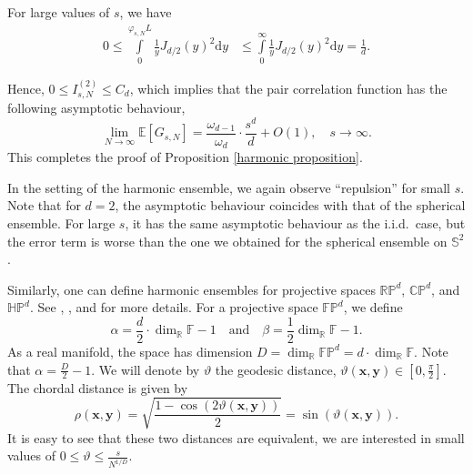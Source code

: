 \documentclass[a4paper,11pt]{amsart}
\begin{document}
For large values of $s$, we have 
\begin{align*}
    0\leq\int\limits_0^{\varphi_{s,N}L}\frac{1}{y}J_{d/2}(y)^2\mathrm{d}y&\leq \int\limits_0^{\infty}\frac{1}{y}J_{d/2}(y)^2\mathrm{d}y=\frac{1}{d}. \label{a_d}
\end{align*}

Hence, $0\leq I^{(2)}_{s,N}\leq C_d$, which implies that the pair correlation function has the following asymptotic behaviour,
$$\lim\limits_{N\rightarrow \infty}\mathbb{E}[G_{s,N}]=\frac{\omega_{d-1}}{\omega_d}\cdot\frac{s^d}{d}+O(1), \quad s\rightarrow \infty.$$
This completes the proof of Proposition \ref{harmonic proposition}.

In the setting of the harmonic ensemble, we again observe ``repulsion'' for small $s$. Note that for $d=2$, the asymptotic behaviour coincides with that of the spherical ensemble. For large $s$, it has the same asymptotic behaviour as the i.i.d.\ case, but the error term is worse than the one we obtained for the spherical ensemble on $\mathbb{S}^2$.


Similarly, one can define harmonic ensembles  for projective spaces $\mathbb{RP}^d$,  $\mathbb{CP}^d$,  and $\mathbb{HP}^d$. See \cite{Anderson2023}, \cite{Brauchart2024}, and \cite{Bilyk2024} for more details. For a projective space $\mathbb{FP}^d$, we define 
$$\alpha =\frac{d}{2}\cdot \dim_{\mathbb{R}}\mathbb{F}-1\quad \text{and}\quad \beta=\frac{1}{2}\dim_{\mathbb{R}}\mathbb{F}-1.$$
As a real manifold, the space has dimension $D=\dim_{\mathbb{R}}\mathbb{FP}^d=d\cdot \dim_{\mathbb{R}}\mathbb{F}$. Note that $\alpha=\frac{D}{2}-1$. We will denote by $\vartheta$ the geodesic distance, $\vartheta(\mathbf{x},\mathbf{y})\in[0,\frac{\pi}{2}]$. The chordal distance  is given by
$$\rho(\mathbf{x},\mathbf{y})=\sqrt{\frac{1-\cos(2\vartheta(\mathbf{x},\mathbf{y}))}{2}}=\sin(\vartheta(\mathbf{x},\mathbf{y})).$$
It is easy to see that these two distances are equivalent, we are interested in small values of $0\leq\vartheta\leq\frac{s}{N^{1/D}}$. 
\end{document}
